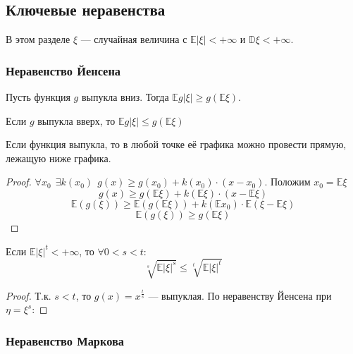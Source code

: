 \subsection{Ключевые неравенства}

В этом разделе \(\xi\) --- случайная величина с \(\mathbb{E}|\xi| < +\infty\) и \(\mathbb{D}\xi < +\infty\).

\subsubsection{Неравенство Йенсена}

\begin{theorem}
    Пусть функция \(g\) выпукла вниз. Тогда \(\mathbb{E}g|\xi| \geq g(\mathbb{E}\xi)\).

    Если \(g\) выпукла вверх, то \(\mathbb{E}g|\xi| \leq g(\mathbb{E}\xi)\)

    \begin{remark}
        Если функция выпукла, то в любой точке её графика можно провести прямую, лежащую ниже графика.
    \end{remark}
\end{theorem}
\begin{proof}
    \(\forall x_0 \ \ \exists k(x_0) \ \ g(x) \geq g(x_0) + k(x_0) \cdot (x - x_0)\). Положим \(x_0 = \mathbb{E}\xi\)
    \[g(x) \geq g(\mathbb{E}\xi) + k(\mathbb{E}\xi) \cdot (x - \mathbb{E}\xi)\]
    \[\mathbb{E}(g(\xi)) \geq \mathbb{E}(g(\mathbb{E}\xi)) + k(\mathbb{E}x_0) \cdot \mathbb{E}(\xi - \mathbb{E}\xi)\]
    \[\mathbb{E}(g(\xi)) \geq g(\mathbb{E}\xi)\]
\end{proof}

\begin{corollary}
    Если \(\mathbb{E}|\xi|^t < +\infty\), то \(\forall 0 < s < t\):
    \[\sqrt[s]{\mathbb{E}|\xi|^s} \leq \sqrt[t]{\mathbb{E}|\xi|^t}\]
\end{corollary}
\begin{proof}
    Т.к. \(s < t\), то \(g(x) = x^{\frac{t}{s}}\) --- выпуклая. По неравенству Йенсена при \(\eta = \xi^s\):
    \unfinished
\end{proof}

\subsubsection{Неравенство Маркова}

